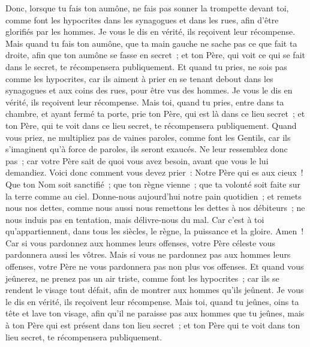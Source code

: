 \begin{multicols}{2}
Donc, lorsque tu fais ton aumône, ne fais pas sonner la trompette devant toi, comme font les hypocrites dans les synagogues et dans les rues, afin d'être glorifiés par les hommes. Je vous le dis en vérité, ils reçoivent leur récompense.
Mais quand tu fais ton aumône, que ta main gauche ne sache pas ce que fait ta droite,
afin que ton aumône se fasse en secret~; et ton Père, qui voit ce qui se fait dans le secret, te récompensera publiquement.
Et quand tu pries, ne sois pas comme les hypocrites, car ils aiment à prier en se tenant debout dans les synagogues et aux coins des rues, pour être vus des hommes. Je vous le dis en vérité, ils reçoivent leur récompense.
Mais toi, quand tu pries, entre dans ta chambre, et ayant fermé ta porte, prie ton Père, qui est là dans ce lieu secret~; et ton Père, qui te voit dans ce lieu secret, te récompensera publiquement.
Quand vous priez, ne multipliez pas de vaines paroles, comme font les Gentils, car ils s'imaginent qu'à force de paroles, ils seront exaucés.
Ne leur ressemblez donc pas~; car votre Père sait de quoi vous avez besoin, avant que vous le lui demandiez.
Voici donc comment vous devez prier~: Notre Père qui es aux cieux~! Que ton Nom soit sanctifié~;
que ton règne vienne~; que ta volonté soit faite sur la terre comme au ciel.
Donne-nous aujourd'hui notre pain quotidien~;
et remets nous nos dettes, comme nous aussi nous remettons les dettes à nos débiteurs~;
ne nous induis pas en tentation, mais délivre-nous du mal. Car c'est à toi qu'appartiennent, dans tous les siècles, le règne, la puissance et la gloire. Amen~!
Car si vous pardonnez aux hommes leurs offenses, votre Père céleste vous pardonnera aussi les vôtres.
Mais si vous ne pardonnez pas aux hommes leurs offenses, votre Père ne vous pardonnera pas non plus vos offenses.
Et quand vous jeûnerez, ne prenez pas un air triste, comme font les hypocrites~; car ils se rendent le visage tout défait, afin de montrer aux hommes qu'ils jeûnent. Je vous le dis en vérité, ils reçoivent leur récompense.
Mais toi, quand tu jeûnes, oins ta tête et lave ton visage,
afin qu'il ne paraisse pas aux hommes que tu jeûnes, mais à ton Père qui est présent dans ton lieu secret~; et ton Père qui te voit dans ton lieu secret, te récompensera publiquement.

\end{multicols}
